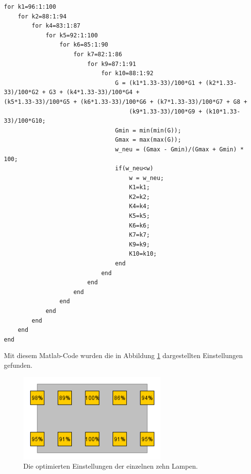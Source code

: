 \documentclass[a4paper,bibtotoc,oneside]{scrbook}
\begin{document}
\begin{verbatim}
for k1=96:1:100
    for k2=88:1:94
        for k4=83:1:87
            for k5=92:1:100
                for k6=85:1:90
                    for k7=82:1:86
                        for k9=87:1:91
                            for k10=88:1:92
                                G = (k1*1.33-33)/100*G1 + (k2*1.33-33)/100*G2 + G3 + (k4*1.33-33)/100*G4 + 		                                    (k5*1.33-33)/100*G5 + (k6*1.33-33)/100*G6 + (k7*1.33-33)/100*G7 + G8 +  
                                    (k9*1.33-33)/100*G9 + (k10*1.33-33)/100*G10;
                                Gmin = min(min(G));
                                Gmax = max(max(G));
                                w_neu = (Gmax - Gmin)/(Gmax + Gmin) * 100;
                                if(w_neu<w)
                                    w = w_neu;
                                    K1=k1;
                                    K2=k2;
                                    K4=k4;
                                    K5=k5;
                                    K6=k6;
                                    K7=k7;
                                    K9=k9;
                                    K10=k10;                                  
                                end
                            end
                        end
                    end
                end
            end
        end
    end
end
\end{verbatim}

Mit diesem Matlab-Code wurden die in Abbildung \ref{opt} dargestellten Einstellungen gefunden.

\begin{figure}[htbp]
\centering
\includegraphics[width=75mm]{img/std.png}
\caption{Die optimierten Einstellungen der einzelnen zehn Lampen.}\label{opt}
\end{figure}
\end{document}
